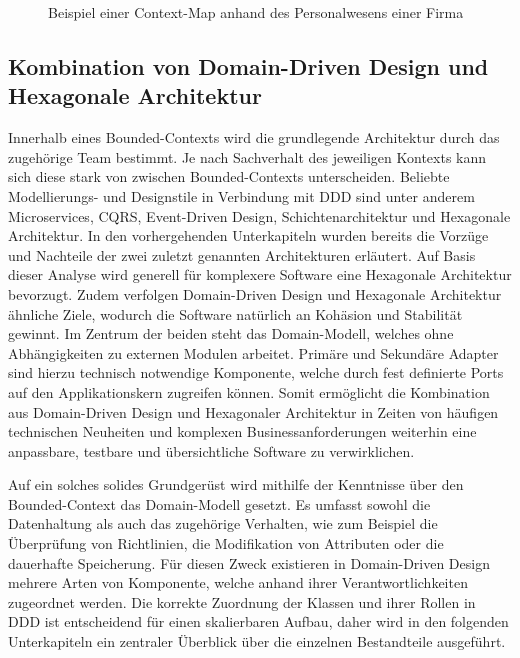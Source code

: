 \begin{figure}
	\centering
	\footnotesize
	
	\caption{Beispiel einer Context-Map anhand des Personalwesens einer Firma}
	\label{fig:Context-Map-Example}
\end{figure}

\subsection{Kombination von Domain-Driven Design und Hexagonale Architektur}

Innerhalb eines Bounded-Contexts wird die grundlegende Architektur durch das zugehörige Team bestimmt. Je nach Sachverhalt des jeweiligen Kontexts kann sich diese stark von zwischen Bounded-Contexts unterscheiden. Beliebte Modellierungs- und Designstile in Verbindung mit DDD sind unter anderem Microservices, \acrshort{CQRS}, Event-Driven Design, Schichtenarchitektur und Hexagonale Architektur. In den vorhergehenden Unterkapiteln wurden bereits die Vorzüge und Nachteile der zwei zuletzt genannten Architekturen erläutert. Auf Basis dieser Analyse wird generell für komplexere Software eine Hexagonale Architektur bevorzugt. Zudem verfolgen Domain-Driven Design und Hexagonale Architektur ähnliche Ziele, wodurch die Software natürlich an Kohäsion und Stabilität gewinnt. Im Zentrum der beiden steht das Domain-Modell, welches ohne Abhängigkeiten zu externen Modulen arbeitet. Primäre und Sekundäre Adapter sind hierzu technisch notwendige Komponente, welche durch fest definierte Ports auf den Applikationskern zugreifen können. Somit ermöglicht die Kombination aus Domain-Driven Design und Hexagonaler Architektur in Zeiten von häufigen technischen Neuheiten und komplexen Businessanforderungen weiterhin eine anpassbare, testbare und übersichtliche Software zu verwirklichen.

Auf ein solches solides Grundgerüst wird mithilfe der Kenntnisse über den Bounded-Context das Domain-Modell gesetzt. Es umfasst sowohl die Datenhaltung als auch das zugehörige Verhalten, wie zum Beispiel die Überprüfung von Richtlinien, die Modifikation von Attributen oder die dauerhafte Speicherung. Für diesen Zweck existieren in Domain-Driven Design mehrere Arten von Komponente, welche anhand ihrer Verantwortlichkeiten zugeordnet werden. Die korrekte Zuordnung der Klassen und ihrer Rollen in DDD ist entscheidend für einen skalierbaren Aufbau, daher wird in den folgenden Unterkapiteln ein zentraler Überblick über die einzelnen Bestandteile ausgeführt.

